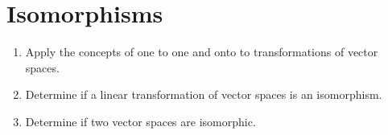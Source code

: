 \section{Isomorphisms}

\begin{outcome}
  \begin{enumerate}
  \item Apply the concepts of one to one and onto to transformations
    of vector spaces.
  \item Determine if a linear transformation of vector spaces is an
    isomorphism.
  \item Determine if two vector spaces are isomorphic.
  \end{enumerate}
\end{outcome}
